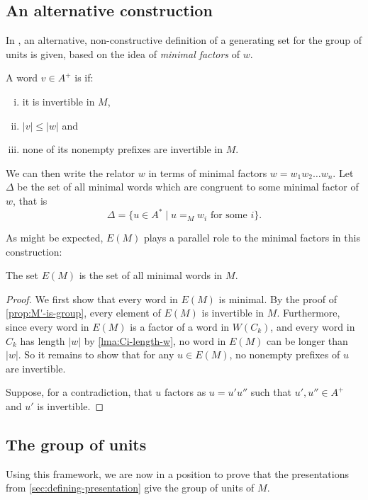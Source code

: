 \documentclass[noindex,noinsetproof,12pt]{lmaths}
\begin{document}
\subsection{An alternative construction}

In \cite{Zhang1992}, an alternative, non-constructive definition of a generating set for the group of units is given, based on the idea of \emph{minimal factors} of $w$.

\begin{defn}
	A word $v \in A^+$ is  if:
	\begin{enumerate}[(i)]
		\item it is invertible in $M$,
		\item $|v| \le |w|$ and
		\item none of its nonempty prefixes are invertible in $M$.
	\end{enumerate}
\end{defn}

We can then write the relator $w$ in terms of minimal factors $w = w_1w_2\ldots w_n$. Let $\Delta$ be the set of all minimal words which are congruent to some minimal factor of $w$, that is
	\[ \Delta = \{ u \in A^* \mid u =_M w_i \text{ for some } i \}. \]

As might be expected, $E(M)$ plays a parallel role to the minimal factors in this construction:

\begin{prop}
	The set $E(M)$ is the set of all minimal words in $M$.
\end{prop}
\begin{proof}
	We first show that every word in $E(M)$ is minimal. By the proof of \cref{prop:M'-is-group}, every element of $E(M)$ is invertible in $M$. Furthermore, since every word in $E(M)$ is a factor of a word in $W(C_k)$, and every word in $C_k$ has length $|w|$ by \cref{lma:Ci-length-w}, no word in $E(M)$ can be longer than $|w|$. So it remains to show that for any $u \in E(M)$, no nonempty prefixes of $u$ are invertible.

	Suppose, for a contradiction, that $u$ factors as $u = u'u''$ such that $u', u'' \in A^+$ and $u'$ is invertible.
\end{proof}


\subsection{The group of units}

Using this framework, we are now in a position to prove that the presentations from \cref{sec:defining-presentation} give the group of units of $M$.
\end{document}
